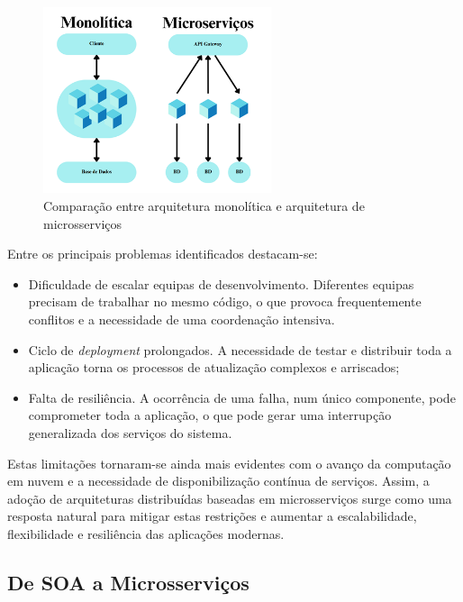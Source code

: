 \begin{figure}[h]
    \centering
    \includegraphics[width=0.6\textwidth]{images/Diagramas/monilitica_vs_microservicos.png}
    \caption{Comparação entre arquitetura monolítica e arquitetura de microsserviços}
    \label{fig:monolitica_microservicos}
\end{figure}

Entre os principais problemas identificados destacam-se:

\begin{itemize}
    \item Dificuldade de escalar equipas de desenvolvimento. Diferentes equipas precisam de trabalhar no mesmo código, o que provoca frequentemente conflitos e a necessidade de uma coordenação intensiva.
    \item Ciclo de \textit{deployment} prolongados. A necessidade de testar e distribuir toda a aplicação torna os processos de atualização complexos e arriscados;
    \item Falta de resiliência. A ocorrência de uma falha, num único componente, pode comprometer toda a aplicação, o que pode gerar uma interrupção generalizada dos serviços do sistema.
\end{itemize}


Estas limitações tornaram-se ainda mais evidentes com o avanço da computação em nuvem e a necessidade
de disponibilização contínua de serviços. Assim, a adoção de arquiteturas distribuídas baseadas em
microsserviços surge como uma resposta natural para mitigar estas restrições e aumentar a escalabilidade,
flexibilidade e resiliência das aplicações modernas.



\clearpage

\subsection{De SOA a Microsserviços}


